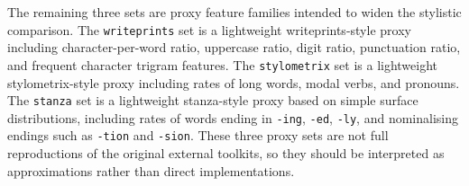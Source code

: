 \documentclass[12pt,a4paper]{article}
\begin{document}
The remaining three sets are proxy feature families intended to widen the stylistic comparison. The \texttt{writeprints} set is a lightweight writeprints-style proxy including character-per-word ratio, uppercase ratio, digit ratio, punctuation ratio, and frequent character trigram features. The \texttt{stylometrix} set is a lightweight stylometrix-style proxy including rates of long words, modal verbs, and pronouns. The \texttt{stanza} set is a lightweight stanza-style proxy based on simple surface distributions, including rates of words ending in \texttt{-ing}, \texttt{-ed}, \texttt{-ly}, and nominalising endings such as \texttt{-tion} and \texttt{-sion}. These three proxy sets are not full reproductions of the original external toolkits, so they should be interpreted as approximations rather than direct implementations.
\end{document}

